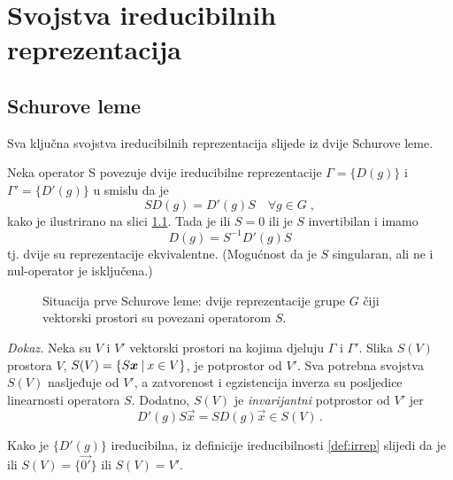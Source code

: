 

\chapter{Svojstva ireducibilnih reprezentacija}

\section{Schurove leme}

Sva ključna svojstva ireducibilnih reprezentacija slijede iz 
dvije Schurove leme.

\begin{teorem}
Neka operator S povezuje dvije  ireducibilne
reprezentacije $\Gamma=\{D(g)\}$ i $\Gamma'=\{D'(g)\}$ u smislu da je
\begin{displaymath}
  SD(g)=D'(g)S  \quad \forall g\in G  \;,
\end{displaymath}
kako je ilustrirano na slici \ref{fig:schur}.
Tada je ili $S=0$ ili je $S$ invertibilan i imamo
\begin{displaymath}
D(g)=S^{-1}D'(g)S
\end{displaymath}
tj. dvije su reprezentacije ekvivalentne. (Mogućnost
da je $S$ singularan, ali ne i nul-operator je isključena.)
\end{teorem}

\begin{figure}[htpb]
    \centering
    \centerline{}
    \caption{Situacija prve Schurove leme: 
        dvije reprezentacije grupe $G$ čiji vektorski prostori su
    povezani operatorom $S$.}
    \label{fig:schur}
\end{figure}

\emph{Dokaz.}
Neka su $V$ i $V'$ vektorski prostori na kojima djeluju $\Gamma$ i $\Gamma'$.
Slika $S(V)$ prostora $V$, $S(V)=\{S\vec{x} \td x \in V \}$, je potprostor od $V'$. 
Sva potrebna svojstva
$S(V)$ nasljeđuje od $V'$, a zatvorenost i egzistencija inverza su 
posljedice linearnosti operatora $S$.
Dodatno, $S(V)$ je \emph{invarijantni} potprostor od $V'$ jer
$$D'(g)S\vec{x}=SD(g)\vec{x} \in S(V)\,.$$

Kako je $\{D'(g)\}$ ireducibilna, iz
definicije ireducibilnosti \ref{def:irrep} slijedi
da je ili $S(V)=\{\vec{0'}\}$ ili $S(V)=V'$.

